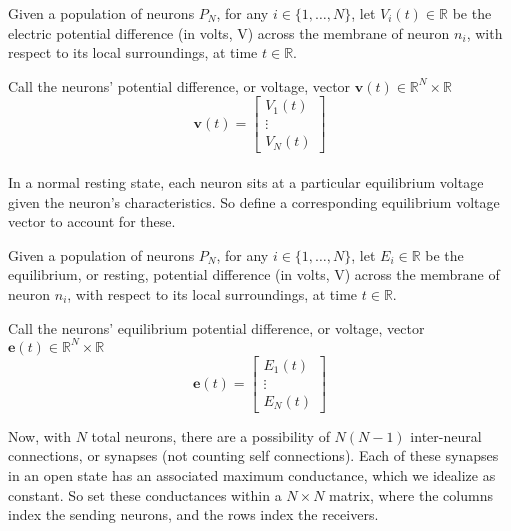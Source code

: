 \documentclass{article}
\begin{document}
\begin{definition}[$\mathbf{v}(t) = \textbf{neuron potential vector}$]\label{v}
Given a population of neurons $P_{N}$, for any $i \in \{ 1, \dots, N \}$, let $V_{i}(t)\in\mathbb{R}$ be the electric potential difference (in volts, V) across the membrane of neuron $n_{i}$, with respect to its local surroundings, at time $t\in\mathbb{R}$.

Call the neurons' potential difference, or voltage, vector $\mathbf{v}(t)\in\mathbb{R}^{N}\times\mathbb{R}$
\[ \mathbf{v}(t) =
\begin{bmatrix}
V_{1}(t) \\
\vdots \\
V_{N}(t)
\end{bmatrix} \]
\end{definition}

\paragraph{}
In a normal resting state, each neuron sits at a particular equilibrium voltage given the neuron's characteristics. So define a corresponding equilibrium voltage vector to account for these.

\begin{definition}[$\mathbf{e}(t) = \textbf{neuron equilibrium potential vector}$]\label{e}
Given a population of neurons $P_{N}$, for any $i \in \{ 1, \dots, N \}$, let $E_{i}\in\mathbb{R}$ be the equilibrium, or resting, potential difference (in volts, V) across the membrane of neuron $n_{i}$, with respect to its local surroundings, at time $t\in\mathbb{R}$.

Call the neurons' equilibrium potential difference, or voltage, vector $\mathbf{e}(t)\in\mathbb{R}^{N}\times\mathbb{R}$ 
\[ \mathbf{e}(t) =
\begin{bmatrix}
E_{1}(t) \\
\vdots \\
E_{N}(t)
\end{bmatrix} \]
\end{definition}

Now, with $N$ total neurons, there are a possibility of $N(N-1)$ inter-neural connections, or synapses (not counting self connections). Each of these synapses in an open state has an associated maximum conductance, which we idealize as constant. So set these conductances within a $N\times N$ matrix, where the columns index the sending neurons, and the rows index the receivers.
\end{document}
